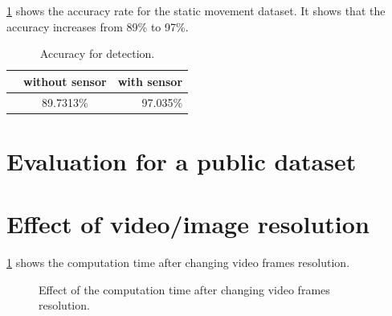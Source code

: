 \ref{t:acc_stat} shows the accuracy rate for the static movement dataset.
It shows that the accuracy increases from 89\% to 97\%.

\begin{table}[h!]
  \centering
  \caption{Accuracy for detection.}
  \label{t:acc_stat}
  \begin{tabular}{  l  c | r  }
   
     & without sensor & with sensor  \\
    \hline
    & 89.7313\% & 97.035\%  \\
    \hline
  \end{tabular}
\end{table}


\section{Evaluation for a public dataset}


\section{Effect of video/image resolution}

\ref{f:vf_res} shows the computation time after changing video frames resolution.

\begin{figure}[h!]
  \centering
  \vspace{2in}
  \caption{Effect of the computation time after changing video frames resolution.}
  \label{f:vf_res}
\end{figure}

